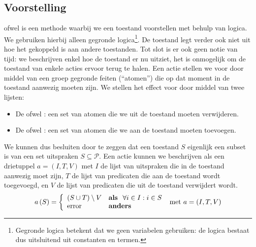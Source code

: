 \subsection{Voorstelling}
 ofwel  is een methode waarbij we een toestand voorstellen met behulp van logica. We gebruiken hierbij alleen gegronde logica\footnote{Gegronde logica betekent dat we geen variabelen gebruiken: de logica bestaat dus uitsluitend uit constanten en termen.}. De toestand legt verder ook niet uit hoe het gekoppeld is aan andere toestanden. Tot slot is er ook geen notie van tijd: we beschrijven enkel hoe de toestand er nu uitziet, het is onmogelijk om de toestand van enkele acties ervoor terug te halen. Een actie stellen we voor door middel van een groep gegronde feiten (``atomen'') die op dat moment in de toestand aanwezig moeten zijn. We stellen het effect voor door middel van twee lijsten:
\begin{itemize}
 \item De  ofwel : een set van atomen die we uit de toestand moeten verwijderen.
 \item De  ofwel : een set van atomen die we aan de toestand moeten toevoegen.
\end{itemize}
We kunnen dus besluiten door te zeggen dat een toestand $S$ eigenlijk een subset is van een set uitspraken $S\subseteq\mathcal{P}$. Een actie kunnen we beschrijven als een drietuppel $a=\left(I,T,V\right)$ met $I$ de lijst van uitspraken die in de toestand aanwezig moet zijn, $T$ de lijst van predicaten die aan de toestand wordt toegevoegd, en $V$ de lijst van predicaten die uit de toestand verwijdert wordt.
\begin{equation}
a\left(S\right)=\left\{\begin{array}{ll}
\left(S\cup T\right)\setminus V&\mbox{\bf als }\ \forall i\in I:i\in S\\
\mbox{error}&\mbox{\bf anders }
\end{array}\right.\mbox{ met }a=\left(I,T,V\right)
\end{equation}
